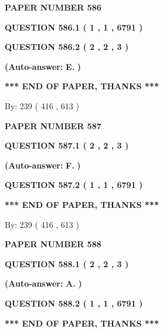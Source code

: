 \documentclass[12pt]{article}
\begin{document}
   
 {\textbf{ \Large{ PAPER NUMBER  586  }}}
   
   
   
   
  
  
{\textbf{\large{QUESTION
586.1 
 ( 1 , 1 , 6791 )
}}}
  
  
{\textbf{\large{QUESTION
586.2 
 ( 2 , 2 , 3 )
}}}
 
 
{\textbf{(Auto-answer:}}
{\textbf{\large{
E.}}}
{\textbf{)}}
 
 
   
   
   
   
\vspace{1.0in} 
{\textbf{\large{ *** END OF PAPER, THANKS *** }}} 
   
   
\hspace{1.0in} By: 
 239 ( 416 ,  613 )
   
   
   
   
\newpage 
\setcounter{page}{ 
   587001 } 
   
   
 {\textbf{ \Large{ PAPER NUMBER  587  }}}
   
   
   
   
  
  
{\textbf{\large{QUESTION
587.1 
 ( 2 , 2 , 3 )
}}}
 
 
{\textbf{(Auto-answer:}}
{\textbf{\large{
F.}}}
{\textbf{)}}
 
 
  
  
{\textbf{\large{QUESTION
587.2 
 ( 1 , 1 , 6791 )
}}}
   
   
   
   
\vspace{1.0in} 
{\textbf{\large{ *** END OF PAPER, THANKS *** }}} 
   
   
\hspace{1.0in} By: 
 239 ( 416 ,  613 )
   
   
   
   
\newpage 
\setcounter{page}{ 
   588001 } 
   
   
 {\textbf{ \Large{ PAPER NUMBER  588  }}}
   
   
   
   
  
  
{\textbf{\large{QUESTION
588.1 
 ( 2 , 2 , 3 )
}}}
 
 
{\textbf{(Auto-answer:}}
{\textbf{\large{
A.}}}
{\textbf{)}}
 
 
  
  
{\textbf{\large{QUESTION
588.2 
 ( 1 , 1 , 6791 )
}}}
   
   
   
   
\vspace{1.0in} 
{\textbf{\large{ *** END OF PAPER, THANKS *** }}} 
   
\end{document}
